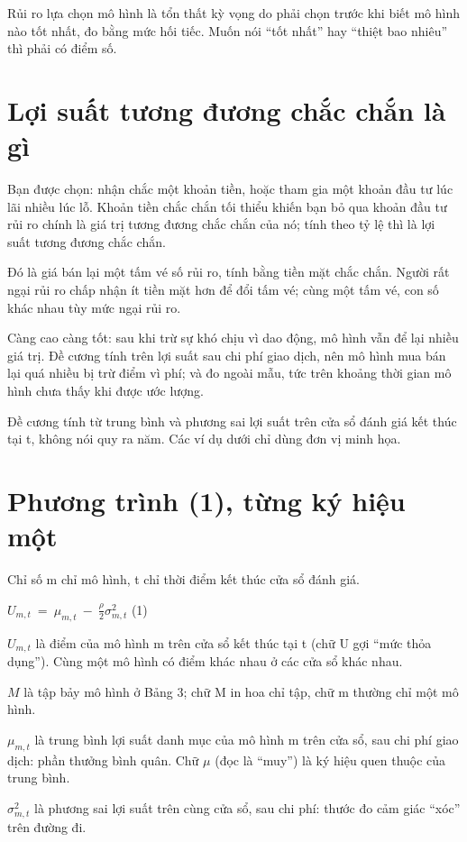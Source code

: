 Rủi ro lựa chọn mô hình là tổn thất kỳ vọng do phải chọn trước khi biết mô hình nào tốt nhất, đo bằng mức hối tiếc. Muốn nói “tốt nhất” hay “thiệt bao nhiêu” thì phải có điểm số.

\section{Lợi suất tương đương chắc chắn là gì}

Bạn được chọn: nhận chắc một khoản tiền, hoặc tham gia một khoản đầu tư lúc lãi nhiều lúc lỗ. Khoản tiền chắc chắn tối thiểu khiến bạn bỏ qua khoản đầu tư rủi ro chính là giá trị tương đương chắc chắn của nó; tính theo tỷ lệ thì là lợi suất tương đương chắc chắn.

Đó là giá bán lại một tấm vé số rủi ro, tính bằng tiền mặt chắc chắn. Người rất ngại rủi ro chấp nhận ít tiền mặt hơn để đổi tấm vé; cùng một tấm vé, con số khác nhau tùy mức ngại rủi ro.

Càng cao càng tốt: sau khi trừ sự khó chịu vì dao động, mô hình vẫn để lại nhiều giá trị. Đề cương tính trên lợi suất sau chi phí giao dịch, nên mô hình mua bán lại quá nhiều bị trừ điểm vì phí; và đo ngoài mẫu, tức trên khoảng thời gian mô hình chưa thấy khi được ước lượng.

Đề cương tính từ trung bình và phương sai lợi suất trên cửa sổ đánh giá kết thúc tại t, không nói quy ra năm. Các ví dụ dưới chỉ dùng đơn vị minh họa.

\section{Phương trình (1), từng ký hiệu một}

Chỉ số m chỉ mô hình, t chỉ thời điểm kết thúc cửa sổ đánh giá.

\(U_{m,t}\  = \ \mu_{m,t}\  - \ \frac{\rho}{2}\sigma_{m,t}^{2}\) (1)

\(U_{m,t}\) là điểm của mô hình m trên cửa sổ kết thúc tại t (chữ U gợi “mức thỏa dụng”). Cùng một mô hình có điểm khác nhau ở các cửa sổ khác nhau.

\(M\) là tập bảy mô hình ở Bảng 3; chữ M in hoa chỉ tập, chữ m thường chỉ một mô hình.

\(\mu_{m,t}\) là trung bình lợi suất danh mục của mô hình m trên cửa sổ, sau chi phí giao dịch: phần thưởng bình quân. Chữ $\mu$ (đọc là “muy”) là ký hiệu quen thuộc của trung bình.

\(\sigma_{m,t}^{2}\) là phương sai lợi suất trên cùng cửa sổ, sau chi phí: thước đo cảm giác “xóc” trên đường đi.

